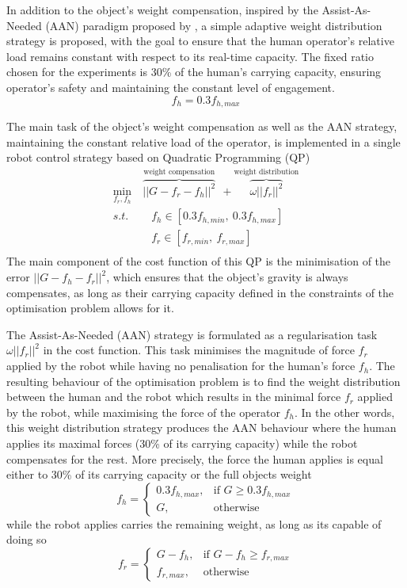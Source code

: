 In addition to the object's weight compensation, inspired by the Assist-As-Needed (AAN) paradigm proposed by 
\citet{carmichael2013admittance}, a simple adaptive weight distribution strategy is proposed, with the goal to ensure that the human operator's relative load remains constant with respect to its real-time capacity. The fixed ratio chosen for the experiments is 30\% of the human's carrying capacity, ensuring operator's safety and maintaining the constant level of engagement.
$$
f_h = 0.3 f_{h,max}
$$

The main task of the object's weight compensation as well as the AAN strategy, maintaining the constant relative load of the operator, is implemented in a single robot control strategy based on Quadratic Programming (QP)
\begin{equation}
\begin{split}
    \min_{f_r,f_h} &~\overbrace{||G - f_r -f_h||^2}^{\text{weight compensation}} ~~+ \overbrace{\omega||f_r||^2}^{\text{weight distribution}}\\
    s.t.& \quad f_h \in[0.3f_{h,min}, ~0.3f_{h,max}]\\
    & \quad f_r \in[f_{r,min}, ~f_{r,max}]\\
\end{split}
\label{eq:qp_human_robot}
\end{equation}
The main component of the cost function of this QP is the minimisation of the error $||G - f_{h} -f_{r}||^2$, which ensures that the object's gravity is always compensates, as long as their carrying capacity defined in the constraints of the optimisation problem allows for it. 

The Assist-As-Needed (AAN) strategy is formulated as a regularisation task $\omega||f_r||^2$ in the cost function. This task minimises the magnitude of force $f_{r}$ applied by the robot while having no penalisation for the human's force $f_h$. The resulting behaviour of the optimisation problem is to find the weight distribution between the human and the robot which results in the minimal force $f_{r}$ applied by the robot, while maximising the force of the operator $f_h$. In the other words, this weight distribution strategy produces the AAN behaviour where the human applies its maximal forces (30\% of its carrying capacity) while the robot compensates for the rest. More precisely, the force the human applies is equal either to 30\% of its carrying capacity or the full objects weight
$$
f_h = \begin{cases}
    0.3f_{h,max},& \text{if } G\geq 0.3f_{h,max}\\
    G,              & \text{otherwise}
\end{cases}
$$
while the robot applies carries the remaining weight, as long as its capable of doing so
$$
f_r =  \begin{cases}
    G-f_h,& \text{if } G-f_h\geq f_{r,max}\\
    f_{r,max},              & \text{otherwise}
\end{cases}
$$

